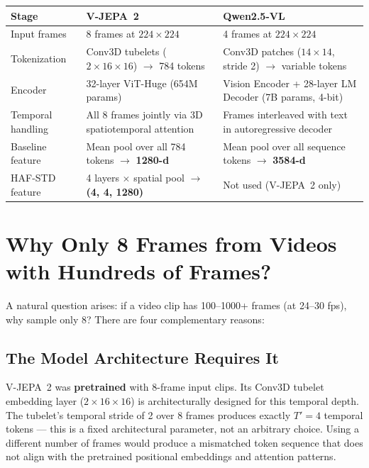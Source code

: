 \documentclass[a4paper, 12pt]{article}
\begin{document}
\begin{center}
\renewcommand{\arraystretch}{1.4}
\begin{tabular}{p{4cm} p{5cm} p{5cm}}
\toprule
\textbf{Stage} & \textbf{V-JEPA~2} & \textbf{Qwen2.5-VL} \\
\midrule
Input frames & 8 frames at $224 \times 224$ & 4 frames at $224 \times 224$ \\
\midrule
Tokenization & Conv3D tubelets ($2\!\times\!16\!\times\!16$) $\rightarrow$ 784 tokens & Conv3D patches ($14\!\times\!14$, stride 2) $\rightarrow$ variable tokens \\
\midrule
Encoder & 32-layer ViT-Huge (654M params) & Vision Encoder + 28-layer LM Decoder (7B params, 4-bit) \\
\midrule
Temporal handling & All 8 frames jointly via 3D spatiotemporal attention & Frames interleaved with text in autoregressive decoder \\
\midrule
Baseline feature & Mean pool over all 784 tokens $\rightarrow$ \textbf{1280-d} & Mean pool over all sequence tokens $\rightarrow$ \textbf{3584-d} \\
\midrule
HAF-STD feature & 4 layers $\times$ spatial pool $\rightarrow$ \textbf{(4, 4, 1280)} & Not used (V-JEPA~2 only) \\
\bottomrule
\end{tabular}
\end{center}

\section{Why Only 8 Frames from Videos with Hundreds of Frames?}

A natural question arises: if a video clip has 100--1000+ frames (at 24--30 fps), why sample only 8? There are four complementary reasons:

\subsection{The Model Architecture Requires It}

V-JEPA~2 was \textbf{pretrained} with 8-frame input clips. Its Conv3D tubelet embedding layer ($2 \times 16 \times 16$) is architecturally designed for this temporal depth. The tubelet's temporal stride of 2 over 8 frames produces exactly $T' = 4$ temporal tokens --- this is a fixed architectural parameter, not an arbitrary choice. Using a different number of frames would produce a mismatched token sequence that does not align with the pretrained positional embeddings and attention patterns.
\end{document}
